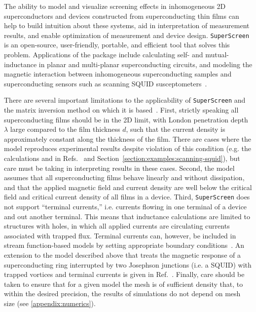 \documentclass[final,3p,times,twocolumn]{elsarticle}
\newcommand{\inline}[1]{\texttt{#1}\xspace}
\newcommand{\SuperScreen}{\inline{SuperScreen}}
\begin{document}
The ability to model and visualize screening effects in inhomogeneous 2D superconductors and devices constructed from superconducting thin films can help to build intuition about these systems, aid in interpretation of measurement results, and enable optimization of measurement and device design. \SuperScreen is an open-source, user-friendly, portable, and efficient tool that solves this problem. Applications of the package include calculating self- and mutual-inductance in planar and multi-planar superconducting circuits, and modeling the magnetic interaction between inhomogeneous superconducting samples and superconducting sensors such as scanning SQUID susceptometers~\cite{Kirtley2016-zz}.

There are several important limitations to the applicability of \SuperScreen and the matrix inversion method on which it is based~\cite{Brandt2004-ew,Brandt2005-wj}. First, strictly speaking all superconducting films should be in the 2D limit, with London penetration depth $\lambda$ large compared to the film thickness $d$, such that the current density is approximately constant along the thickness of the film. There are cases where the model reproduces experimental results despite violation of this condition (e.g. the calculations and in Refs.~\cite{Kirtley2016-zz,Kirtley2016-gt} and Section~\ref{section:examples:scanning-squid}), but care must be taking in interpreting results in these cases. Second, the model assumes that all superconducting films behave linearly and without dissipation, and that the applied magnetic field and current density are well below the critical field and critical current density of all films in a device. Third, \SuperScreen does not support ``terminal currents,'' i.e. currents flowing in one terminal of a device and out another terminal. This means that inductance calculations are limited to structures with holes, in which all applied currents are circulating currents associated with trapped flux. Terminal currents can, however, be included in stream function-based models by setting appropriate boundary conditions~\cite{Khapaev1997-kw,Khapaev2001-xq,Khapaev2001-pw,Muller2021-ci}. An extension to the model described above that treats the magnetic response of a superconducting ring interrupted by two Josephson junctions (i.e. a SQUID) with trapped vortices and terminal currents is given in Ref.~\cite{Clem2005-ye}. Finally, care should be taken to ensure that for a given model the mesh is of sufficient density that, to within the desired precision, the results of simulations do not depend on mesh size (see \ref{appendix:numerics}).
\end{document}
